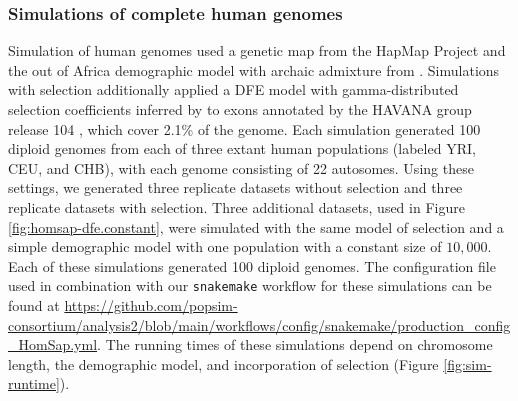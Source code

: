 \documentclass[hidelinks]{article}
\newcommand{\stdpopsim}{\texttt{stdpopsim}\xspace}
\newcommand{\snakemake}{\texttt{snakemake}\xspace}
\begin{document}
    \subsubsection*{Simulations of complete human genomes}
    Simulation of human genomes used a genetic map from the HapMap Project
    \citep[\stdpopsim label \texttt{HapMapII\_GRCh38}]{international2007second} and
    the out of Africa demographic model with archaic admixture from
    \citet[\stdpopsim label \texttt{OutOfAfricaArchaicAdmixture\_5R19}]{ragsdale2019models}.
    Simulations with selection additionally applied a DFE model with gamma-distributed selection coefficients inferred by
    \citet[\stdpopsim label \texttt{Gamma\_K17}]{kim2017inference} to exons annotated by the HAVANA group release 104
    \citep[\stdpopsim label \texttt{ensembl\_havana\_104\_exons}]{ensembl2018},
    which cover 2.1\% of the genome. 
    Each simulation generated 100 diploid genomes from each of three extant human populations (labeled YRI, CEU, and CHB),
    with each genome consisting of 22 autosomes.
    Using these settings, we generated three replicate datasets without selection
    and three replicate datasets with selection.
    Three additional datasets, used in Figure \ref{fig:homsap-dfe.constant},
    were simulated with the same model of selection and a simple demographic model with one population with a constant size of $10,000$.
    Each of these simulations generated 100 diploid genomes.
    The configuration file used in combination with our \snakemake workflow
    for these simulations can be found at \url{https://github.com/popsim-consortium/analysis2/blob/main/workflows/config/snakemake/production_config_HomSap.yml}.
    The running times of these simulations depend on chromosome length, the demographic model, and incorporation of selection (Figure \ref{fig:sim-runtime}). 
\end{document}
